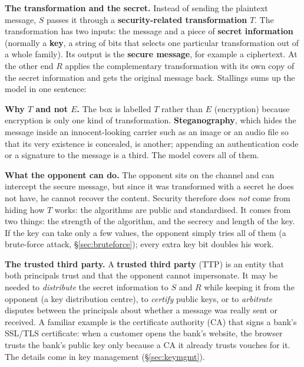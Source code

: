 \textbf{The transformation and the secret.} Instead of sending the plaintext message, $S$ passes it through a \textbf{security-related transformation} $T$. The transformation has two inputs: the message and a piece of \textbf{secret information} (normally a \textbf{key}, a string of bits that selects one particular transformation out of a whole family). Its output is the \textbf{secure message}, for example a ciphertext. At the other end $R$ applies the complementary transformation with its own copy of the secret information and gets the original message back. Stallings sums up the model in one sentence: 

\textbf{Why $T$ and not $E$.} The box is labelled $T$ rather than $E$ (encryption) because encryption is only one kind of transformation. \textbf{Steganography}, which hides the message inside an innocent-looking carrier such as an image or an audio file so that its very existence is concealed, is another; appending an authentication code or a signature to the message is a third. The model covers all of them.

\textbf{What the opponent can do.} The opponent sits on the channel and can intercept the secure message, but since it was transformed with a secret he does not have, he cannot recover the content. Security therefore does \emph{not} come from hiding how $T$ works: the algorithms are public and standardised. It comes from two things: the strength of the algorithm, and the secrecy and length of the key. If the key can take only a few values, the opponent simply tries all of them (a brute-force attack, \S\ref{sec:bruteforce}); every extra key bit doubles his work.

\textbf{The trusted third party.} A \textbf{trusted third party} (TTP) is an entity that both principals trust and that the opponent cannot impersonate. It may be needed to \emph{distribute} the secret information to $S$ and $R$ while keeping it from the opponent (a key distribution centre), to \emph{certify} public keys, or to \emph{arbitrate} disputes between the principals about whether a message was really sent or received. A familiar example is the certificate authority (CA) that signs a bank's SSL/TLS certificate: when a customer opens the bank's website, the browser trusts the bank's public key only because a CA it already trusts vouches for it. The details come in key management (\S\ref{sec:keymgmt}).

